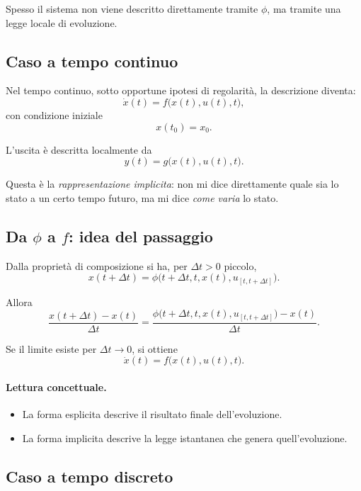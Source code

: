 Spesso il sistema non viene descritto direttamente tramite $\phi$, ma tramite una legge locale di evoluzione.

\subsection{Caso a tempo continuo}

Nel tempo continuo, sotto opportune ipotesi di regolarità, la descrizione diventa:
\begin{equation}
\dot x(t)=f\bigl(x(t),u(t),t\bigr),
\label{eq:L2_ct_state}
\end{equation}
con condizione iniziale
\[
x(t_0)=x_0.
\]

L'uscita è descritta localmente da
\begin{equation}
y(t)=g\bigl(x(t),u(t),t\bigr).
\label{eq:L2_ct_output}
\end{equation}

Questa è la \emph{rappresentazione implicita}: non mi dice direttamente quale sia lo stato a un certo tempo futuro, ma mi dice \emph{come varia} lo stato.

\subsection{Da \texorpdfstring{$\phi$}{phi} a \texorpdfstring{$f$}{f}: idea del passaggio}

Dalla proprietà di composizione si ha, per $\Delta t>0$ piccolo,
\[
x(t+\Delta t)=\phi\bigl(t+\Delta t,t,x(t),u_{[t,t+\Delta t]}\bigr).
\]

Allora
\[
\frac{x(t+\Delta t)-x(t)}{\Delta t}
=
\frac{\phi\bigl(t+\Delta t,t,x(t),u_{[t,t+\Delta t]}\bigr)-x(t)}{\Delta t}.
\]

Se il limite esiste per $\Delta t\to 0$, si ottiene
\[
\dot x(t)=f\bigl(x(t),u(t),t\bigr).
\]

\paragraph{Lettura concettuale.}
\begin{itemize}
    \item La forma esplicita descrive il risultato finale dell'evoluzione.
    \item La forma implicita descrive la legge istantanea che genera quell'evoluzione.
\end{itemize}

\subsection{Caso a tempo discreto}

